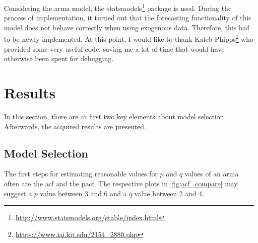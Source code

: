 Considering the \gls{arma} model, the statsmodels\footnote{\url{http://www.statsmodels.org/stable/index.html}} package is used. During the process of implementation, it turned out that the forecasting functionality of this model does not behave correctly when using exogenous data. Therefore, this had to be newly implemented. At this point, I would like to thank Kaleb Phipps\footnote{\url{https://www.iai.kit.edu/2154_2880.php}} who provided some very useful code, saving me a lot of time that would have otherwise been spent for debugging.\\


\section{Results}
\label{sec:results}

In this section, there are at first two key elements about model selection. Afterwards, the acquired results are presented.\\


\subsection*{Model Selection}

The first steps for estimating reasonable values for $p$ and $q$ values of an \gls{arma} often are the \gls{acf} and the \gls{pacf}. The respective plots in \cref{fig:acf_compare} may suggest a $p$ value between 3 and 6 and a $q$ value between 2 and 4.\\

